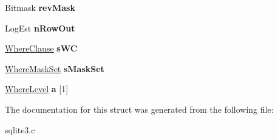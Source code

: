 \begin{DoxyCompactItemize}
\item 
Bitmask {\bfseries rev\+Mask}\hypertarget{structWhereInfo_abff60764e39a62d7ede2a5d8f1ce4fff}{}\label{structWhereInfo_abff60764e39a62d7ede2a5d8f1ce4fff}

\item 
Log\+Est {\bfseries n\+Row\+Out}\hypertarget{structWhereInfo_a694860f22a9fb8d9edae023fc134cf6f}{}\label{structWhereInfo_a694860f22a9fb8d9edae023fc134cf6f}

\item 
\hyperlink{structWhereClause}{Where\+Clause} {\bfseries s\+WC}\hypertarget{structWhereInfo_ab5690a0fa9f78c25a79dd9e50d747fdf}{}\label{structWhereInfo_ab5690a0fa9f78c25a79dd9e50d747fdf}

\item 
\hyperlink{structWhereMaskSet}{Where\+Mask\+Set} {\bfseries s\+Mask\+Set}\hypertarget{structWhereInfo_ae51ef2af01420b9370a844ee32cc5fc5}{}\label{structWhereInfo_ae51ef2af01420b9370a844ee32cc5fc5}

\item 
\hyperlink{structWhereLevel}{Where\+Level} {\bfseries a} \mbox{[}1\mbox{]}\hypertarget{structWhereInfo_a427337160cbeaf64b23a8241fb10dbf9}{}\label{structWhereInfo_a427337160cbeaf64b23a8241fb10dbf9}

\end{DoxyCompactItemize}


The documentation for this struct was generated from the following file\+:\begin{DoxyCompactItemize}
\item 
sqlite3.\+c\end{DoxyCompactItemize}
